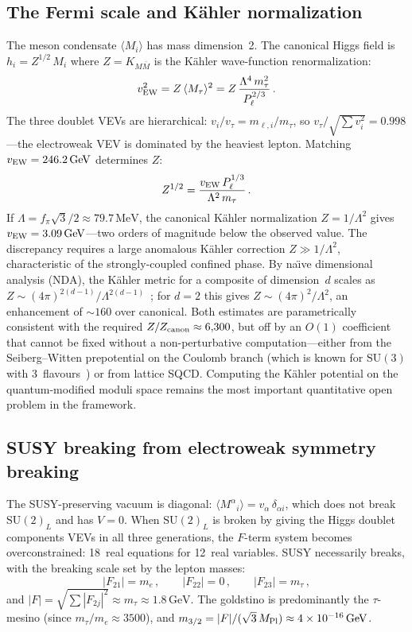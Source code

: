 \documentclass[12pt,a4paper]{article}
\newcommand{\SU}{\mathrm{SU}}
\newcommand{\MeV}{\,\mathrm{MeV}}
\newcommand{\GeV}{\,\mathrm{GeV}}
\begin{document}
\subsection{The Fermi scale and K\"ahler normalization}

The meson condensate $\langle M_i\rangle$ has mass dimension~2.
The canonical Higgs field is
$h_i = Z^{1/2}\,M_i$ where $Z = K_{M\bar M}$ is the K\"ahler
wave-function renormalization:
\begin{equation}
  v_{\rm EW}^2 = Z\,\langle M_\tau\rangle^2
  = Z\,\frac{\Lambda^4\,m_\tau^2}{P_\ell^{2/3}}\,.
  \label{eq:vew}
\end{equation}
The three doublet VEVs are hierarchical:
$v_i/v_\tau = m_{\ell,i}/m_\tau$, so
$v_\tau/\sqrt{\sum v_i^2} = 0.998$---the electroweak VEV is
dominated by the heaviest lepton.
Matching $v_{\rm EW} = 246.2\GeV$ determines $Z$:
\begin{equation}
  Z^{1/2} = \frac{v_{\rm EW}\,P_\ell^{1/3}}{\Lambda^2\,m_\tau}\,.
  \label{eq:Zfactor}
\end{equation}
If $\Lambda = f_\pi\sqrt{3}/2 \approx 79.7\MeV$, the canonical
K\"ahler normalization $Z = 1/\Lambda^2$ gives
$v_{\rm EW} = 3.09\GeV$---two orders of magnitude below the
observed value. The discrepancy requires a large anomalous K\"ahler
correction $Z \gg 1/\Lambda^2$, characteristic of the
strongly-coupled confined phase.
By na\"{\i}ve dimensional analysis (NDA), the K\"ahler metric for a
composite of dimension~$d$ scales as
$Z \sim (4\pi)^{2(d-1)}/\Lambda^{2(d-1)}$~\cite{Luty:1998}; for
$d=2$ this gives $Z \sim (4\pi)^2/\Lambda^2$, an enhancement
of $\sim 160$ over canonical.
Both estimates are parametrically consistent with the required
$Z/Z_{\rm canon} \approx 6{,}300$, but off by an $O(1)$ coefficient that
cannot be fixed without a non-perturbative computation---either from
the Seiberg--Witten prepotential on the Coulomb branch
(which is known for $\SU(3)$ with 3~flavours~\cite{Argyres:1995wt})
or from lattice SQCD.
Computing the K\"ahler potential on the
quantum-modified moduli space remains the most important
quantitative open problem in the framework.

\subsection{SUSY breaking from electroweak symmetry breaking}

The SUSY-preserving vacuum is diagonal:
$\langle M^\alpha{}_i\rangle = v_\alpha\,\delta_{\alpha i}$, which does
not break $\SU(2)_L$ and has $V = 0$.
When $\SU(2)_L$ is broken by giving the Higgs doublet components
VEVs in all three generations, the $F$-term system becomes
overconstrained: 18~real equations for 12~real variables.
SUSY necessarily breaks, with the breaking scale set by the
lepton masses:
\begin{equation}
  |F_{21}| = m_e\,, \qquad
  |F_{22}| = 0\,, \qquad
  |F_{23}| = m_\tau\,,
  \label{eq:Fterms_lepton}
\end{equation}
and $|F| = \sqrt{\sum |F_{2j}|^2} \approx m_\tau \approx 1.8\GeV$.
The goldstino is predominantly the $\tau$-mesino (since
$m_\tau/m_e \approx 3500$), and
$m_{3/2} = |F|/(\sqrt{3}\,M_{\rm Pl})
\approx 4\times 10^{-16}\GeV$.
\end{document}
